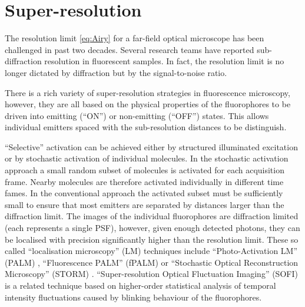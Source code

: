 \section{Super-resolution\label{sec:super-resolution}}

The resolution limit \autoref{eq:Airy} for a far-field optical microscope has been challenged in past two decades. Several research teams have reported sub-diffraction resolution in fluorescent samples. In fact, the resolution limit is no longer dictated by diffraction but by the signal-to-noise ratio. 

There is a rich variety of super-resolution strategies in fluorescence microscopy, however, they are all based on the physical properties of the fluorophores to be driven into emitting (``ON'') or non-emitting (``OFF'') states. This allows individual emitters spaced with the sub-resolution distances to be distinguish.

``Selective'' activation can be achieved either by structured illuminated excitation or by stochastic activation of individual molecules. In the stochastic activation approach a small random subset of molecules is activated for each acquisition frame. Nearby molecules are therefore activated individually in different time fames. In the conventional approach the activated subset must be sufficiently small to ensure that most emitters are separated by distances larger than the diffraction limit. The images of the individual fluorophores are diffraction limited (each represents a single PSF), however, given enough detected photons, they can be localised with precision significantly higher than the resolution limit. These so called ``localisation microscopy'' (LM) techniques include ``Photo-Activation LM'' (PALM) \cite{Betzig2006}, ``Fluorescence PALM'' (fPALM) \cite{Hess2006} or ``Stochastic Optical Reconstruction Microscopy'' (STORM) \cite{Rust2006}.  ``Super-resolution Optical Fluctuation Imaging'' (SOFI) \cite{Dertinger2009} is a related technique based on higher-order statistical analysis of temporal intensity fluctuations caused by blinking behaviour of the fluorophores.


